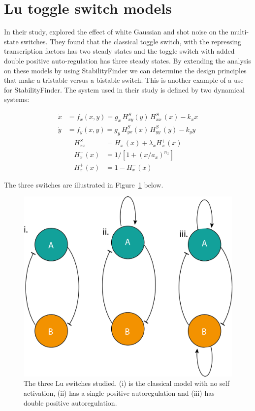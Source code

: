 \section{Lu toggle switch models}
In their study, \cite{Lu:2013br} explored the effect of white Gaussian and shot noise on the multi-state switches. They found that the classical toggle switch, with the repressing transcription factors has two steady states and the toggle switch with added double positive auto-regulation has three steady states. By extending the analysis on these models by using StabilityFinder we can determine the design principles that make a tristable versus a bistable switch. This is another example of a use for StabilityFinder.
The system used in their study is defined by two dynamical systems:

\begin{align}
\dot{x} &= f_{x}(x,y) =g_{x}\, H^{S}_{xy}(y)\, H^{S}_{xx}\,(x)-k_{x}x \label{eq:lu_both_1} \\
\dot{y} &= f_{y}(x,y) =g_{y}\,H^{S}_{yx}(x)\,H^{S}_{yy}\,(y)-k_{y}y \label{eq:lu_both_2}
\end{align}
\begin{align}
H^{S}_{xx} &= H^{-}_{x}(x)+\lambda_{x}H^{+}_{x}(x)\label{eq:lu_hsxx}\\
H^{-}_{x}(x) &= 1 \big/\left[1+(x/a_{x})^{n_{x}}\right]\label{eq:lu_hpx}\\
H^{+}_{x}(x) &= 1-H^{-}_{x}(x)\label{eq:lu_hmx}
\end{align}

The three switches are illustrated in Figure~\ref{fig:lu_sketch} below. 


\begin{figure}[htbp]
\centering
\includegraphics[scale=0.5]{chapterStabilityFinder/Lu_switches/images/lu_three_switches_sketch.png}
\caption[Lu switches]{The three Lu switches studied. (i) is the classical model with no self activation, (ii) has a single positive autoregulation and (iii) has double positive autoregulation. }
\label{fig:lu_sketch}
\end{figure}


